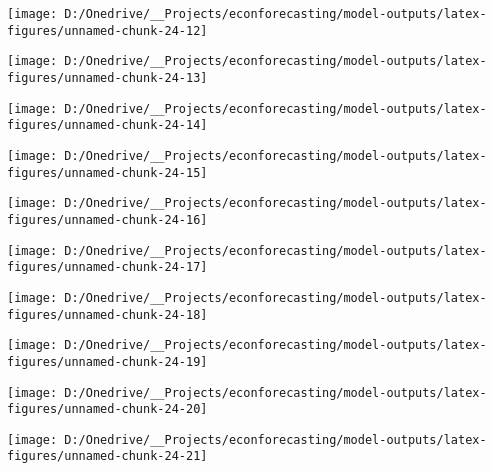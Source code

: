\documentclass[11pt, letterpaper]{article}\usepackage[]{graphicx}\usepackage[]{color}
\begin{document}
{\centering \texttt{[image: D:/Onedrive/\_\_Projects/econforecasting/model-outputs/latex-figures/unnamed-chunk-24-12]} 

}




{\centering \texttt{[image: D:/Onedrive/\_\_Projects/econforecasting/model-outputs/latex-figures/unnamed-chunk-24-13]} 

}




{\centering \texttt{[image: D:/Onedrive/\_\_Projects/econforecasting/model-outputs/latex-figures/unnamed-chunk-24-14]} 

}




{\centering \texttt{[image: D:/Onedrive/\_\_Projects/econforecasting/model-outputs/latex-figures/unnamed-chunk-24-15]} 

}




{\centering \texttt{[image: D:/Onedrive/\_\_Projects/econforecasting/model-outputs/latex-figures/unnamed-chunk-24-16]} 

}




{\centering \texttt{[image: D:/Onedrive/\_\_Projects/econforecasting/model-outputs/latex-figures/unnamed-chunk-24-17]} 

}




{\centering \texttt{[image: D:/Onedrive/\_\_Projects/econforecasting/model-outputs/latex-figures/unnamed-chunk-24-18]} 

}




{\centering \texttt{[image: D:/Onedrive/\_\_Projects/econforecasting/model-outputs/latex-figures/unnamed-chunk-24-19]} 

}




{\centering \texttt{[image: D:/Onedrive/\_\_Projects/econforecasting/model-outputs/latex-figures/unnamed-chunk-24-20]} 

}




{\centering \texttt{[image: D:/Onedrive/\_\_Projects/econforecasting/model-outputs/latex-figures/unnamed-chunk-24-21]} 

}
\end{document}
